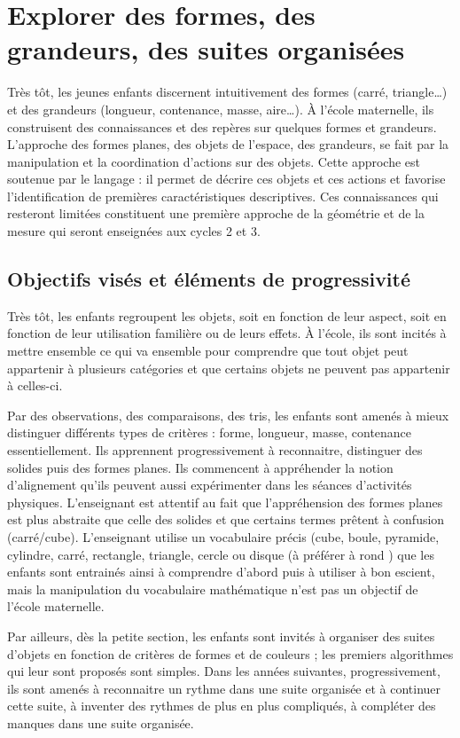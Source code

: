 \section{Explorer des formes, des grandeurs, des suites organisées}
Très tôt, les jeunes enfants discernent intuitivement des formes (carré, triangle\dots) et des grandeurs (longueur, contenance, masse, aire\dots). À l’école maternelle, ils construisent des connaissances et des repères sur quelques formes et grandeurs. L’approche des formes planes, des objets de l’espace, des grandeurs, se fait par la manipulation et la coordination d’actions sur des objets. Cette approche est soutenue par le langage : il permet de décrire ces objets et ces actions et favorise l’identification de premières caractéristiques descriptives. Ces connaissances qui resteront limitées constituent une première approche de la géométrie et de la mesure qui seront enseignées aux cycles 2 et 3.

\subsection{Objectifs visés et éléments de progressivité}
Très tôt, les enfants regroupent les objets, soit en fonction de leur aspect, soit en fonction de leur utilisation familière ou de leurs effets. À l’école, ils sont incités à \og mettre ensemble ce qui va ensemble \fg{} pour comprendre que tout objet peut appartenir à plusieurs catégories et que certains objets ne peuvent pas appartenir à celles-ci.
 
Par des observations, des comparaisons, des tris, les enfants sont amenés à mieux distinguer différents types de critères : forme, longueur, masse, contenance essentiellement. Ils apprennent progressivement à reconnaitre, distinguer des solides puis des formes planes. Ils commencent à appréhender la notion d’alignement qu’ils peuvent aussi expérimenter dans les séances d’activités physiques. L’enseignant est attentif au fait que l’appréhension des formes planes est plus abstraite que celle des solides et que certains termes prêtent à confusion (carré/cube). L’enseignant utilise un vocabulaire précis  (cube, boule, pyramide, cylindre, carré, rectangle, triangle, cercle ou disque (à préférer à \og rond \fg{}) que les enfants sont entrainés ainsi à comprendre d’abord puis à utiliser à bon escient, mais la manipulation du vocabulaire mathématique n’est pas un objectif de l’école maternelle. 

Par ailleurs, dès la petite section, les enfants sont invités à organiser des suites d’objets en fonction de critères de formes et de couleurs ; les premiers algorithmes qui leur sont proposés sont simples. Dans les années suivantes, progressivement, ils sont amenés à reconnaitre un rythme dans une suite organisée et à continuer cette suite, à inventer des \og rythmes \fg{} de plus en plus compliqués, à compléter des manques dans une suite organisée. 


